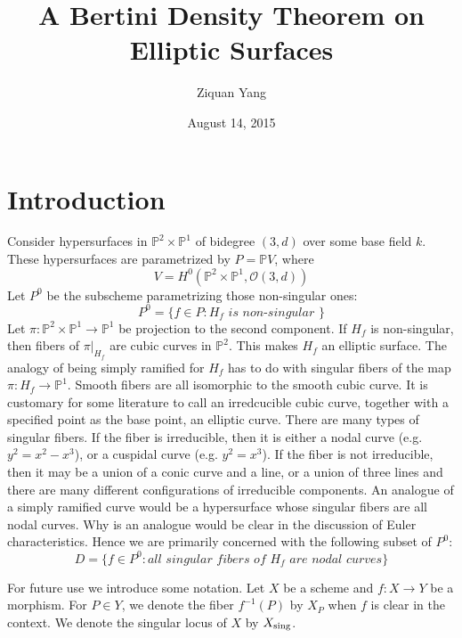 \documentclass[12pt]{article}
\theoremstyle{plain}
\theoremstyle{definition}
\newcommand{\IP}{\mathbb{P}}
\newcommand{\sO}{\mathcal{O}}
\newcommand{\sing}{{\rm sing}}
\newcommand{\<}{\langle}
\renewcommand{\>}{\rangle}
\begin{document}
%

\title{A Bertini Density Theorem on Elliptic Surfaces}
\author{Ziquan Yang}


\date{August 14, 2015}


\maketitle
 

\setcounter{section}{0}

\section{Introduction}
Consider hypersurfaces in $\IP^2 \times \IP^1$ of bidegree $(3, d)$ over some base field $k$. These hypersurfaces are parametrized by $P = \IP V$, where
$$ V = H^0 ( \IP^2 \times \IP^1, \sO(3, d) ) $$
Let $P^0$ be the subscheme parametrizing those non-singular ones:
$$ P^0 = \{ f \in P : H_f \textit{ is non-singular }\} $$
Let $\pi : \IP^2 \times \IP^1 \to \IP^1$ be projection to the second component. If $H_f$ is non-singular, then fibers of $\pi|_{H_f}$ are cubic curves in $\IP^2$. This makes $H_f$ an elliptic surface. The analogy of being simply ramified for $H_f$ has to do with singular fibers of the map $\pi : H_f \to \IP^1$. Smooth fibers are all isomorphic to the smooth cubic curve. It is customary for some literature to call an irredcucible cubic curve, together with a specified point as the base point, an elliptic curve. There are many types of singular fibers. If the fiber is irreducible, then it is either a nodal curve (e.g. $y^2 = x^2 - x^3$), or a cuspidal curve (e.g. $y^2 = x^3$). If the fiber is not irreducible, then it may be a union of a conic curve and a line, or a union of three lines and there are many different configurations of irreducible components. 
An analogue of a simply ramified curve would be a hypersurface whose singular fibers are all nodal curves. Why is an analogue would be clear in the discussion of Euler characteristics. Hence we are primarily concerned with the following subset of $P^0$: 
$$ D = \{ f \in P^0 : \textit{all singular fibers of $H_f$ are nodal curves} \}$$

For future use we introduce some notation. Let $X$ be a scheme and $f : X \to Y$ be a morphism. For $P \in Y$, we denote the fiber $f^{-1}(P)$ by $X_P$ when $f$ is clear in the context. We denote the singular locus of $X$ by $X_\sing$. 
\end{document}
